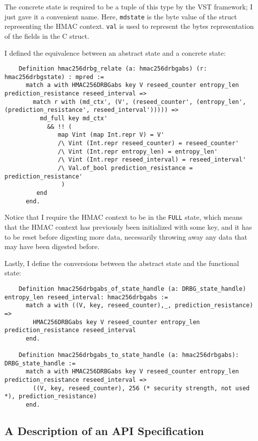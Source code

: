 \documentclass[pageno]{jpaper}
\begin{document}
The concrete state is required to be a tuple of this type by the VST framework; I just gave it a convenient name. Here, \lstinline{mdstate} is the byte value of the struct representing the HMAC context. \lstinline{val} is used to represent the bytes representation of the fields in the C struct.

I defined the equivalence between an abstract state and a concrete state:

\begin{lstlisting}
    Definition hmac256drbg_relate (a: hmac256drbgabs) (r: hmac256drbgstate) : mpred :=
      match a with HMAC256DRBGabs key V reseed_counter entropy_len prediction_resistance reseed_interval =>
        match r with (md_ctx', (V', (reseed_counter', (entropy_len', (prediction_resistance', reseed_interval'))))) =>
          md_full key md_ctx'
            && !! (
               map Vint (map Int.repr V) = V'
               /\ Vint (Int.repr reseed_counter) = reseed_counter'
               /\ Vint (Int.repr entropy_len) = entropy_len'
               /\ Vint (Int.repr reseed_interval) = reseed_interval'
               /\ Val.of_bool prediction_resistance = prediction_resistance'
                )
         end
      end.
\end{lstlisting}

Notice that I require the HMAC context to be in the \lstinline{FULL} state, which means that the HMAC context has previously been initialized with some key, and it has to be reset before digesting more data, necessarily throwing away any data that may have been digested before.

Lastly, I define the conversions between the abstract state and the functional state:

\begin{lstlisting}
    Definition hmac256drbgabs_of_state_handle (a: DRBG_state_handle) entropy_len reseed_interval: hmac256drbgabs :=
      match a with ((V, key, reseed_counter),_, prediction_resistance) =>
        HMAC256DRBGabs key V reseed_counter entropy_len prediction_resistance reseed_interval
      end.

    Definition hmac256drbgabs_to_state_handle (a: hmac256drbgabs): DRBG_state_handle :=
      match a with HMAC256DRBGabs key V reseed_counter entropy_len prediction_resistance reseed_interval =>
        ((V, key, reseed_counter), 256 (* security strength, not used *), prediction_resistance)
      end.
\end{lstlisting}

\subsection{A Description of an API Specification}
\end{document}
